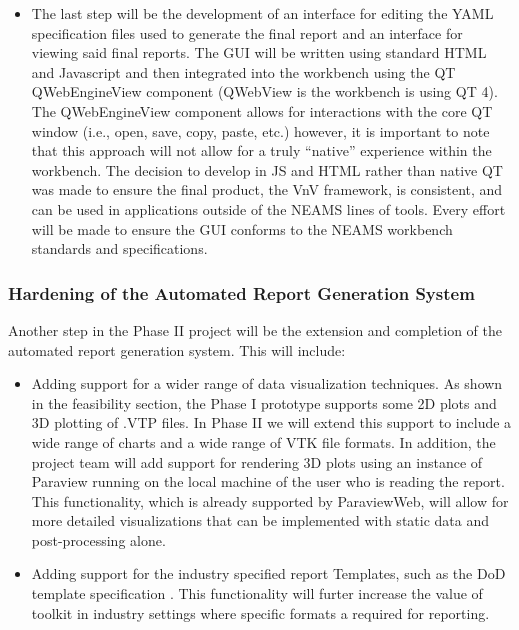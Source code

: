 \begin{itemize}
\item The last step will be the development of an interface for editing the YAML specification files used to generate the final report and an interface 
for viewing said final reports. The GUI will be written using standard HTML and Javascript and then integrated into the workbench using the QT QWebEngineView component (QWebView is the workbench is using QT 4). The QWebEngineView component allows for interactions with the core QT window (i.e., open, save, copy, paste, etc.) however, it is important to note that this approach will not allow for a truly ``native'' experience within the workbench. The decision to develop in JS and HTML rather than native QT was made to ensure the final product, the VnV framework, is consistent, and can be used in applications outside of the NEAMS lines of tools. Every effort will be made to ensure the GUI conforms to the NEAMS workbench standards and specifications. 
\end{itemize}

\subsubsection{Hardening of the Automated Report Generation System} 

Another step in the Phase II project will be the extension and completion of the automated report generation system. This will include:
\begin{itemize} 
 \item Adding support for a wider range of data visualization techniques. As shown in the feasibility section, the Phase I prototype supports some 2D plots and 3D plotting of .VTP files. In Phase II we will extend this support to include a wide range of charts and a wide range of VTK file formats. In addition, the project team will add support for rendering 3D plots using an instance of Paraview running on the local machine of the user who is reading the report. This functionality, which is already supported by ParaviewWeb, will allow for more detailed visualizations that can be implemented with static data and post-processing alone. 
 \item Adding support for the industry specified \VV report Templates, such as the DoD \VV template specification \cite{}. This functionality will furter increase the value of toolkit in industry settings where specific formats a required for \VV reporting. 

 \end{itemize}


